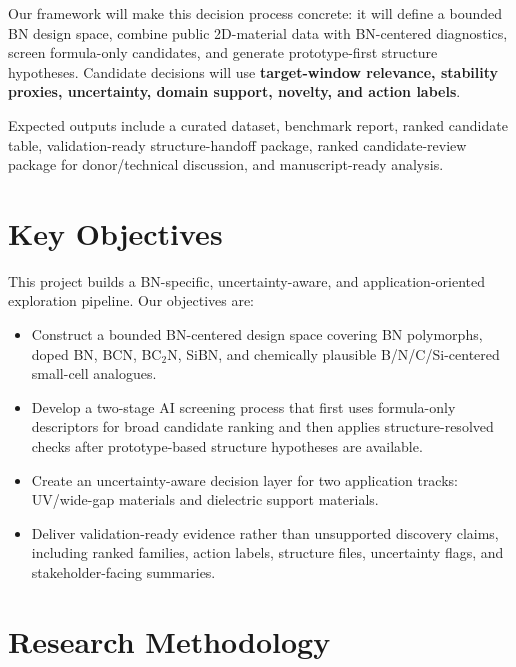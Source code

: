 \documentclass[12pt,a4paper]{article}
\begin{document}
Our framework will make this decision process concrete: it will define a bounded BN design space, combine public 2D-material data with BN-centered diagnostics, screen formula-only candidates, and generate prototype-first structure hypotheses. Candidate decisions will use \textbf{target-window relevance, stability proxies, uncertainty, domain support, novelty, and action labels}.

Expected outputs include a curated dataset, benchmark report, ranked candidate table, validation-ready structure-handoff package, ranked candidate-review package for donor/technical discussion, and manuscript-ready analysis.

\vspace{-10pt}
\section{Key Objectives}

This project builds a BN-specific, uncertainty-aware, and application-oriented exploration pipeline. Our objectives are:

\begin{itemize}[leftmargin=*]
\item Construct a bounded BN-centered design space covering BN polymorphs, doped BN, BCN, BC$_2$N, SiBN, and chemically plausible B/N/C/Si-centered small-cell analogues.

\item Develop a two-stage AI screening process that first uses formula-only descriptors for broad candidate ranking and then applies structure-resolved checks after prototype-based structure hypotheses are available.

\item Create an uncertainty-aware decision layer for two application tracks: UV/wide-gap materials and dielectric support materials.

\item Deliver validation-ready evidence rather than unsupported discovery claims, including ranked families, action labels, structure files, uncertainty flags, and stakeholder-facing summaries.
\end{itemize}

\vspace{-20pt}
\section{Research Methodology}
\vspace{-10pt}
\end{document}
